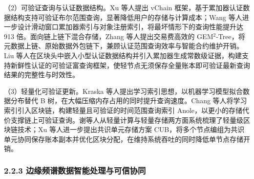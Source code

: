 （2）可验证查询与认证数据结构。Xu 等人\cite{XuZX19}提出 vChain 框架，基于累加器认证数据结构支持可验证布尔范围查询，显著降低用户的存储与计算成本；Wang 等人\cite{WangXZXPP22}进一步设计滑动窗口累加器索引与对象注册索引，将最坏情形下的查询性能提升达 913 倍。面向链上链下混合存储，Zhang 等人\cite{ZhangXXTC19}提出交易费高效的 GEM$^2$-Tree，将元数据上链、原始数据外包链下，兼顾认证范围查询效率与智能合约维护开销。Liu 等人\cite{Liu2024veffChain}在区块头中嵌入小型认证数据结构并引入累加器生成常数级证据，构建支持新鲜性认证的可验证富查询框架，使轻节点无须保存全量账本即可验证最新查询结果的完整性与时效性。

（3）轻量化可验证更新。Kraska 等人\cite{KraskaBCDP18}提出学习索引思想，以机器学习模型拟合数据分布替代 B 树，在大幅压缩内存占用的同时提升查询速度。Chang 等人\cite{ChangLXLJ23}将学习索引引入区块链，构建轻量且可验证的时间范围查询索引 Anole，以更小的存储代价支撑链上可验证查询。谢等人\cite{XieQQ23}从轻量计算与轻量存储两方面系统梳理了轻量级区块链技术；Xu 等人\cite{XuHC18}进一步提出共识单元存储方案 CUB，将多个节点编组为共识单元协同保存账本副本并优化区块分配，在维持系统吞吐的同时降低单节点存储开销。

\subsubsection{2.2.3 边缘频谱数据智能处理与可信协同}

